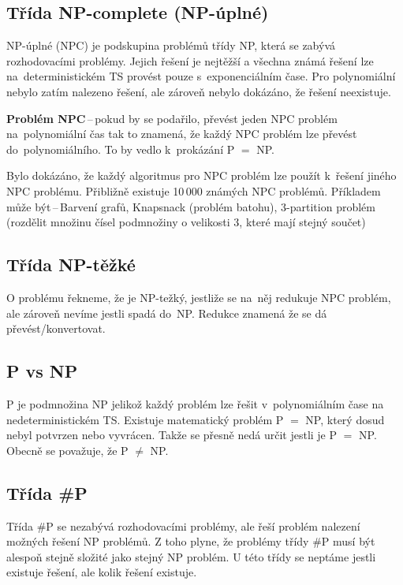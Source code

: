 \subsection{Třída NP-complete (NP-úplné)}

NP-úplné (NPC) je podskupina problémů třídy NP, která se zabývá rozhodovacími problémy.
Jejich řešení je nejtěžší a všechna známá řešení lze na~deterministickém TS provést pouze s~exponenciálním čase. 
Pro polynomiální nebylo zatím nalezeno řešení, ale zároveň nebylo dokázáno, že řešení neexistuje.

\textbf{Problém NPC}\,--\,pokud by se podařilo, převést jeden NPC problém na~polynomiální čas tak to znamená, že každý NPC problém lze převést do~polynomiálního. 
To by vedlo k~prokázání P $=$ NP.

Bylo dokázáno, že každý algoritmus pro NPC problém lze použít k~řešení jiného NPC problému.
Přibližně existuje 10\,000 známých NPC problémů.
Příkladem může být\,--\,Barvení grafů, Knapsnack (problém batohu), 3-partition problém (rozdělit množinu čísel podmnožiny o velikosti 3, které mají stejný součet)

\subsection{Třída NP-těžké}

O problému řekneme, že je NP-težký, jestliže se na~něj redukuje NPC problém, ale zároveň nevíme jestli spadá do~NP.
Redukce znamená že se dá převést/konvertovat.

\subsection{P vs NP}

P je podmnožina NP jelikož každý problém lze řešit v~polynomiálním čase na
 nedeterministickém TS.
Existuje matematický problém P $=$ NP, který dosud nebyl potvrzen nebo vyvrácen. Takže se přesně nedá určit jestli je P $=$ NP. 
Obecně se považuje, že P $\neq$ NP.

\subsection{Třída \#P}

Třída \#P se nezabývá rozhodovacími problémy, ale řeší problém nalezení možných řešení NP problémů. 
Z toho plyne, že problémy třídy \#P musí být alespoň stejně složité jako stejný NP problém.
U této třídy se neptáme jestli existuje řešení, ale kolik řešení existuje.

